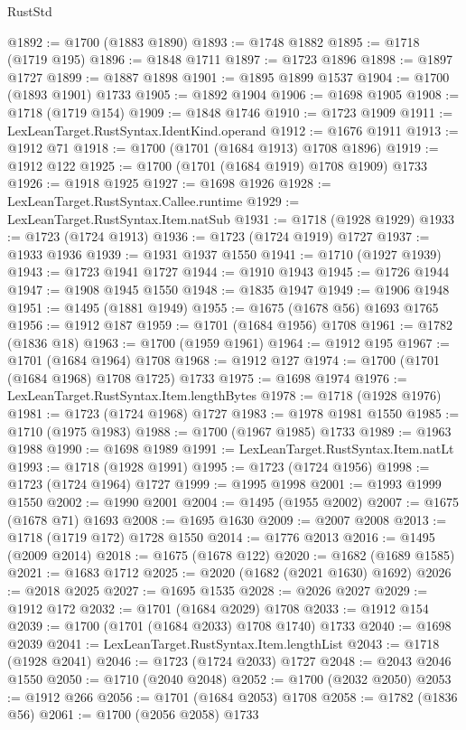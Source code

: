 \begin{lexlean}{RustStd}
\begin{coremodule}
@1892 := @1700 (@1883 @1890)
@1893 := @1748 @1882
@1895 := @1718 (@1719 @195)
@1896 := @1848 @1711
@1897 := @1723 @1896
@1898 := @1897 @1727
@1899 := @1887 @1898
@1901 := @1895 @1899 @1537
@1904 := @1700 (@1893 @1901) @1733
@1905 := @1892 @1904
@1906 := @1698 @1905
@1908 := @1718 (@1719 @154)
@1909 := @1848 @1746
@1910 := @1723 @1909
@1911 := LexLeanTarget.RustSyntax.IdentKind.operand
@1912 := @1676 @1911
@1913 := @1912 @71
@1918 := @1700 (@1701 (@1684 @1913) @1708 @1896)
@1919 := @1912 @122
@1925 := @1700 (@1701 (@1684 @1919) @1708 @1909) @1733
@1926 := @1918 @1925
@1927 := @1698 @1926
@1928 := LexLeanTarget.RustSyntax.Callee.runtime
@1929 := LexLeanTarget.RustSyntax.Item.natSub
@1931 := @1718 (@1928 @1929)
@1933 := @1723 (@1724 @1913)
@1936 := @1723 (@1724 @1919) @1727
@1937 := @1933 @1936
@1939 := @1931 @1937 @1550
@1941 := @1710 (@1927 @1939)
@1943 := @1723 @1941 @1727
@1944 := @1910 @1943
@1945 := @1726 @1944
@1947 := @1908 @1945 @1550
@1948 := @1835 @1947
@1949 := @1906 @1948
@1951 := @1495 (@1881 @1949)
@1955 := @1675 (@1678 @56) @1693 @1765
@1956 := @1912 @187
@1959 := @1701 (@1684 @1956) @1708
@1961 := @1782 (@1836 @18)
@1963 := @1700 (@1959 @1961)
@1964 := @1912 @195
@1967 := @1701 (@1684 @1964) @1708
@1968 := @1912 @127
@1974 := @1700 (@1701 (@1684 @1968) @1708 @1725) @1733
@1975 := @1698 @1974
@1976 := LexLeanTarget.RustSyntax.Item.lengthBytes
@1978 := @1718 (@1928 @1976)
@1981 := @1723 (@1724 @1968) @1727
@1983 := @1978 @1981 @1550
@1985 := @1710 (@1975 @1983)
@1988 := @1700 (@1967 @1985) @1733
@1989 := @1963 @1988
@1990 := @1698 @1989
@1991 := LexLeanTarget.RustSyntax.Item.natLt
@1993 := @1718 (@1928 @1991)
@1995 := @1723 (@1724 @1956)
@1998 := @1723 (@1724 @1964) @1727
@1999 := @1995 @1998
@2001 := @1993 @1999 @1550
@2002 := @1990 @2001
@2004 := @1495 (@1955 @2002)
@2007 := @1675 (@1678 @71) @1693
@2008 := @1695 @1630
@2009 := @2007 @2008
@2013 := @1718 (@1719 @172) @1728 @1550
@2014 := @1776 @2013
@2016 := @1495 (@2009 @2014)
@2018 := @1675 (@1678 @122)
@2020 := @1682 (@1689 @1585)
@2021 := @1683 @1712
@2025 := @2020 (@1682 (@2021 @1630) @1692)
@2026 := @2018 @2025
@2027 := @1695 @1535
@2028 := @2026 @2027
@2029 := @1912 @172
@2032 := @1701 (@1684 @2029) @1708
@2033 := @1912 @154
@2039 := @1700 (@1701 (@1684 @2033) @1708 @1740) @1733
@2040 := @1698 @2039
@2041 := LexLeanTarget.RustSyntax.Item.lengthList
@2043 := @1718 (@1928 @2041)
@2046 := @1723 (@1724 @2033) @1727
@2048 := @2043 @2046 @1550
@2050 := @1710 (@2040 @2048)
@2052 := @1700 (@2032 @2050)
@2053 := @1912 @266
@2056 := @1701 (@1684 @2053) @1708
@2058 := @1782 (@1836 @56)
@2061 := @1700 (@2056 @2058) @1733

\end{coremodule}
\end{lexlean}
